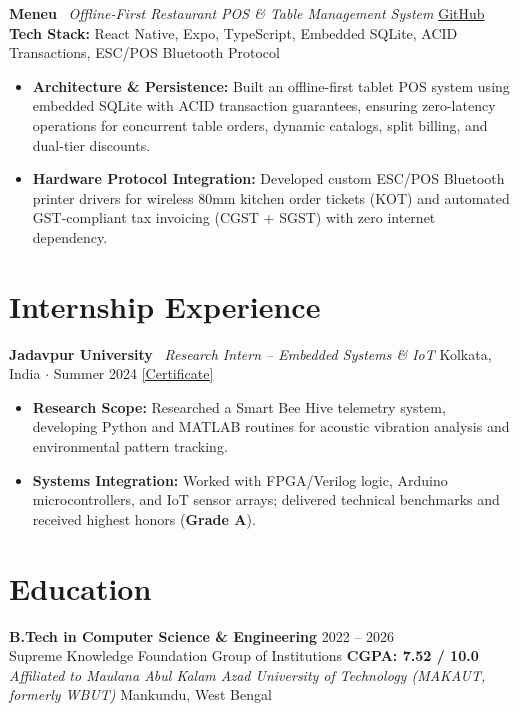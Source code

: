 \documentclass[10pt,a4paper]{article}
\begin{document}
\noindent
\textbf{Meneu} \textbar\ \textit{Offline-First Restaurant POS \& Table Management System} \hfill \href{https://github.com/FardeenAnsari/RestaurantPOS}{GitHub}\\
{\footnotesize\textbf{Tech Stack:} React Native, Expo, TypeScript, Embedded SQLite, ACID Transactions, ESC/POS Bluetooth Protocol}
\begin{itemize}
\item \textbf{Architecture \& Persistence:} Built an offline-first tablet POS system using embedded SQLite with ACID transaction guarantees, ensuring zero-latency operations for concurrent table orders, dynamic catalogs, split billing, and dual-tier discounts.
\item \textbf{Hardware Protocol Integration:} Developed custom ESC/POS Bluetooth printer drivers for wireless 80mm kitchen order tickets (KOT) and automated GST-compliant tax invoicing (CGST + SGST) with zero internet dependency.
\end{itemize}

\section*{Internship Experience}
\noindent
\textbf{Jadavpur University} \textbar\ \textit{Research Intern -- Embedded Systems \& IoT} \hfill Kolkata, India $\cdot$ Summer 2024 \quad \href{https://drive.google.com/file/d/1XP1j9ylUgpK528J4_yt1luJFLb9CBnwl/view?usp=drive_link}{\small [Certificate]}
\begin{itemize}
\item \textbf{Research Scope:} Researched a Smart Bee Hive telemetry system, developing Python and MATLAB routines for acoustic vibration analysis and environmental pattern tracking.
\item \textbf{Systems Integration:} Worked with FPGA/Verilog logic, Arduino microcontrollers, and IoT sensor arrays; delivered technical benchmarks and received highest honors (\textbf{Grade A}).
\end{itemize}

\section*{Education}
\noindent
\textbf{B.Tech in Computer Science \& Engineering} \hfill 2022 -- 2026\\
Supreme Knowledge Foundation Group of Institutions \hfill \textbf{CGPA: 7.52 / 10.0}\\
\textit{Affiliated to Maulana Abul Kalam Azad University of Technology (MAKAUT, formerly WBUT)} \hfill Mankundu, West Bengal
\end{document}
